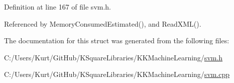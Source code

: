 Definition at line 167 of file svm.\+h.



Referenced by Memory\+Consumed\+Estimated(), and Read\+X\+M\+L().



The documentation for this struct was generated from the following files\+:\begin{DoxyCompactItemize}
\item 
C\+:/\+Users/\+Kurt/\+Git\+Hub/\+K\+Square\+Libraries/\+K\+K\+Machine\+Learning/\hyperlink{svm_8h}{svm.\+h}\item 
C\+:/\+Users/\+Kurt/\+Git\+Hub/\+K\+Square\+Libraries/\+K\+K\+Machine\+Learning/\hyperlink{svm_8cpp}{svm.\+cpp}\end{DoxyCompactItemize}
